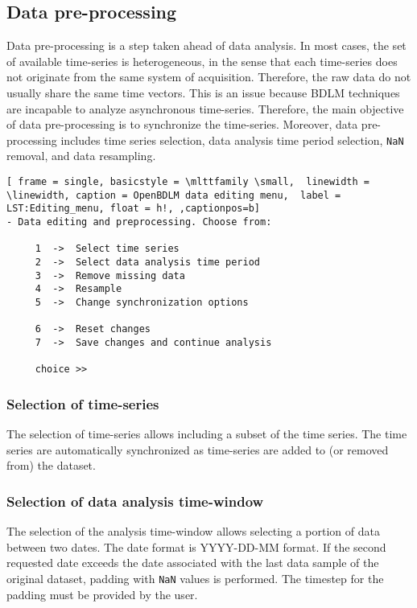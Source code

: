 \subsection{Data pre-processing}
\label{S:DATAEDITINGPREPROCESSING}

Data pre-processing is a step taken ahead of data analysis.
In most cases, the set of available time-series is heterogeneous, in the sense that each time-series does not originate from the same system of acquisition.
Therefore, the raw data do not usually share the same time vectors.
This is an issue because BDLM techniques are incapable to analyze asynchronous time-series.
Therefore, the main objective of data pre-processing is to synchronize the time-series. 
Moreover, data pre-processing includes time series selection, data analysis time period selection, \lstinline[basicstyle = \mlttfamily \small ]!NaN! removal, and data resampling.

\begin{lstlisting}[ frame = single, basicstyle = \mlttfamily \small,  linewidth = \linewidth, caption = OpenBDLM data editing menu,  label = LST:Editing_menu, float = h!, ,captionpos=b]
- Data editing and preprocessing. Choose from:

     1  ->  Select time series
     2  ->  Select data analysis time period 
     3  ->  Remove missing data
     4  ->  Resample
     5  ->  Change synchronization options

     6  ->  Reset changes
     7  ->  Save changes and continue analysis

     choice >> 
\end{lstlisting}    

\subsubsection{Selection of time-series}
\label{SS:SelectionTimeSeries}

The selection of time-series allows including a subset of the time series.
The time series are automatically synchronized as time-series are added to (or removed from) the dataset.

\subsubsection{Selection of data analysis time-window}
\label{SS:SelectionPeriodAnalysis}

The selection of the analysis time-window allows selecting a portion of data between two dates.
The date format is \textquotesingle YYYY-DD-MM\textquotesingle {} format.
If the second requested date exceeds the date associated with the last data sample of the original dataset, padding with \lstinline[basicstyle = \mlttfamily \small ]!NaN! values is performed. 
The timestep for the padding must be provided by the user.

